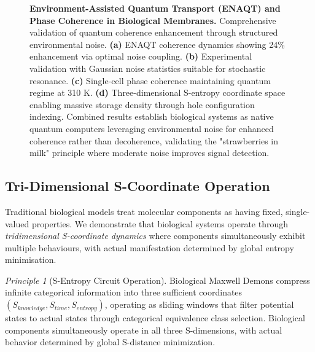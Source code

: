 \documentclass{article}
\theoremstyle{definition}
\theoremstyle{remark}
\newtheorem{principle}[theorem]{Principle}
\begin{document}
\begin{figure}[htbp]
    \caption{\textbf{Environment-Assisted Quantum Transport (ENAQT) and Phase Coherence in Biological Membranes.} Comprehensive validation of quantum coherence enhancement through structured environmental noise. \textbf{(a)} ENAQT coherence dynamics showing 24\% enhancement via optimal noise coupling. \textbf{(b)} Experimental validation with Gaussian noise statistics suitable for stochastic resonance. \textbf{(c)} Single-cell phase coherence maintaining quantum regime at 310 K. \textbf{(d)} Three-dimensional S-entropy coordinate space enabling massive storage density through hole configuration indexing. Combined results establish biological systems as native quantum computers leveraging environmental noise for enhanced coherence rather than decoherence, validating the "strawberries in milk" principle where moderate noise improves signal detection.}
    \label{fig:enaqt_phase_coherence_panel}
\end{figure}

\subsection{Tri-Dimensional S-Coordinate Operation}

Traditional biological models treat molecular components as having fixed, single-valued properties. We demonstrate that biological systems operate through \textit{tridimensional S-coordinate dynamics} where components simultaneously exhibit multiple behaviours, with actual manifestation determined by global entropy minimisation.

\begin{principle}[S-Entropy Circuit Operation]
Biological Maxwell Demons compress infinite categorical information into three sufficient coordinates $(S_{knowledge}, S_{time}, S_{entropy})$, operating as sliding windows that filter potential states to actual states through categorical equivalence class selection. Biological components simultaneously operate in all three S-dimensions, with actual behavior determined by global S-distance minimization.
\end{principle}
\end{document}
